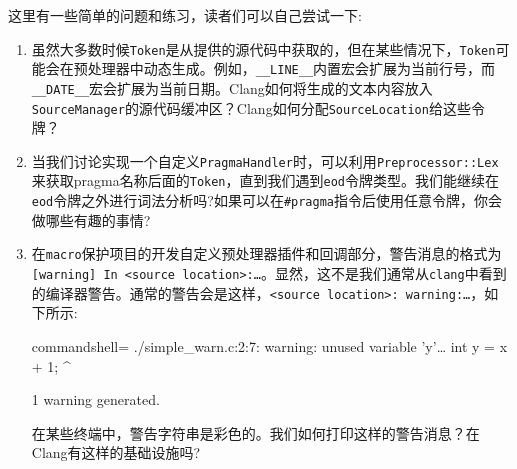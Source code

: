 
这里有一些简单的问题和练习，读者们可以自己尝试一下:

\begin{enumerate}
\item 虽然大多数时候\texttt{Token}是从提供的源代码中获取的，但在某些情况下，\texttt{Token}可能会在预处理器中动态生成。例如，\texttt{\_\_LINE\_\_}内置宏会扩展为当前行号，而\texttt{\_\_DATE\_\_}宏会扩展为当前日期。Clang如何将生成的文本内容放入\texttt{SourceManager}的源代码缓冲区？Clang如何分配\texttt{SourceLocation}给这些令牌？

\item 当我们讨论实现一个自定义\texttt{PragmaHandler}时，可以利用\texttt{Preprocessor::Lex}来获取pragma名称后面的\texttt{Token}，直到我们遇到\texttt{eod}令牌类型。我们能继续在\texttt{eod}令牌之外进行词法分析吗?如果可以在\texttt{\#pragma}指令后使用任意令牌，你会做哪些有趣的事情?

\item 在\texttt{macro}保护项目的开发自定义预处理器插件和回调部分，警告消息的格式为\texttt{[warning] In <source location>:…}。显然，这不是我们通常从\texttt{clang}中看到的编译器警告。通常的警告会是这样，\texttt{<source location>: warning:…}，如下所示:

\begin{tcblisting}{commandshell={}}
./simple_warn.c:2:7: warning: unused variable 'y'…
  int y = x + 1;
       ^

1 warning generated.
\end{tcblisting}

在某些终端中，警告字符串是彩色的。我们如何打印这样的警告消息？在Clang有这样的基础设施吗?

\end{enumerate}












